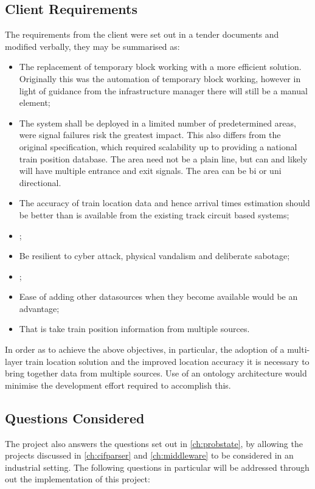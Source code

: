 \subsection{Client Requirements}
\label{sec:client}
The requirements from the client were set out in a tender documents and modified verbally, they may be summarised as:
\begin{itemize}
    \item The replacement of temporary block working with a more efficient solution. Originally this was the automation of temporary block working, however in light of guidance from the infrastructure manager there will still be a manual element;
    \item The system shall be deployed in a limited number of predetermined areas, were signal failures risk the greatest impact. This also differs from the original specification, which required scalability up to providing a national train position database. The area need not be a plain line, but can and likely will have multiple entrance and exit signals. The area can be bi or uni directional.
    \item The accuracy of train location data and hence arrival times estimation should be better than is available from the existing track circuit based systems;
    \item {};
    \item Be resilient to cyber attack, physical vandalism and deliberate sabotage;
    \item {} ;
    \item Ease of adding other datasources when they become available would be an advantage;
    \item {} That is take train position information from multiple sources. 
\end{itemize}

In order as to achieve the above objectives, in particular, the adoption of a multi-layer train location solution and the improved location accuracy it is necessary to bring together data from multiple sources. Use of an ontology architecture would minimise the development effort required to accomplish this.

\subsection{Questions Considered}
The project also answers the questions set out in \autoref{ch:probstate}, by allowing the projects discussed in \autoref{ch:cifparser} and \autoref{ch:middleware} to be considered in an industrial setting. The following questions in particular will be addressed through out the implementation of this project:


